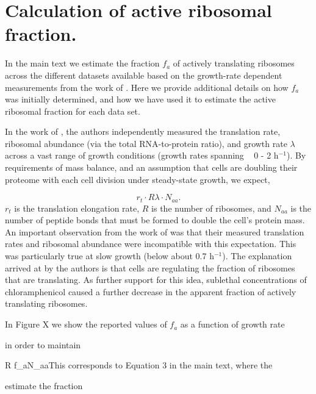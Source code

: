\section{Calculation of active ribosomal fraction.}

In the main text we estimate the fraction $f_a$ of actively translating ribosomes across
the different datasets available based on the growth-rate dependent measurements from the work
of \citep{dai2016}. Here we provide additional details on how $f_a$ was initially determined,
and how we have used it to estimate the active ribosomal fraction for each data set.

In the work of \citep{dai2016}, the authors independently measured the
translation rate, ribosomal abundance (via the total RNA-to-protein ratio), and
growth rate $\lambda$ across a vast range of growth conditions (growth rates spanning ~ 0
- 2 h$^{-1}$). By requirements of mass balance, and an assumption that cells are doubling their
proteome with each cell division under steady-state growth, we expect,

\begin{equation}
  r_t \cdot R  \lambda \cdot N_{aa}.
\end{equation}
$r_t$ is the translation elongation rate, $R$ is the number of ribosomes, and $N_{aa}$ is the number of peptide bonds that must be formed to double the cell's protein mass. An important observation from the work of \citep{dai2016} was that their measured translation rates and ribosomal abundance were incompatible with this expectation. This was particularly true at slow growth (below about 0.7 h$^{-1}$). The explanation arrived at by the authors is that cells are regulating the fraction of ribosomes that are translating. As further support for this idea, sublethal concentrations of chloramphenicol caused a further decrease in the apparent
fraction of actively translating ribosomes.

In Figure X we show the reported values of $f_a$ as a function of growth rate 

in order to maintain


 \cdot R \cdot f_a$ $N_{aa}This corresponds to Equation 3 in the main text, where the

estimate the fraction

